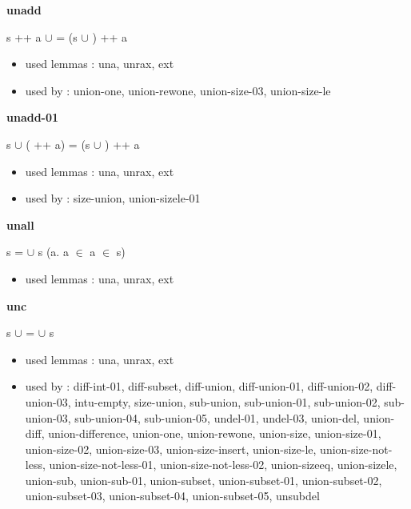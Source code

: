 \documentclass[a4paper]{article}
\begin{document}
\medskip

\bigskip

{\large\bf unadd}

\medskip

 \Fol s ++ a $\cup$  = (s $\cup$ ) ++ a

\begin{itemize}


\item       used lemmas  : una, unrax, ext
\item       used by      : union-one, union-rewone, union-size-03, union-size-le

\end{itemize}

\medskip

\bigskip

{\large\bf unadd-01}

\medskip

 \Fol s $\cup$ ( ++ a) = (s $\cup$ ) ++ a

\begin{itemize}


\item       used lemmas  : una, unrax, ext
\item       used by      : size-union, union-sizele-01

\end{itemize}

\medskip

\bigskip

{\large\bf unall}

\medskip

 \Fol s =  $\cup$ s \Equiv (\All a. a $\in$  \Imp a $\in$ s)

\begin{itemize}


\item       used lemmas  : una, unrax, ext

\end{itemize}

\medskip

\bigskip

{\large\bf unc}

\medskip

 \Fol s $\cup$  =  $\cup$ s

\begin{itemize}


\item       used lemmas  : una, unrax, ext
\item       used by      : diff-int-01, diff-subset, diff-union, diff-union-01, diff-union-02, diff-union-03, intu-empty, size-union, sub-union, sub-union-01, sub-union-02, sub-union-03, sub-union-04, sub-union-05, undel-01, undel-03, union-del, union-diff, union-difference, union-one, union-rewone, union-size, union-size-01, union-size-02, union-size-03, union-size-insert, union-size-le, union-size-not-less, union-size-not-less-01, union-size-not-less-02, union-sizeeq, union-sizele, union-sub, union-sub-01, union-subset, union-subset-01, union-subset-02, union-subset-03, union-subset-04, union-subset-05, unsubdel

\end{itemize}
\end{document}
